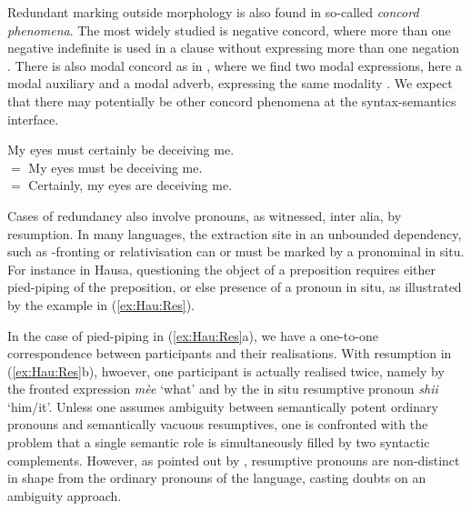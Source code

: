 \documentclass[output=paper]{langscibook}
\begin{document}
Redundant marking outside morphology is also found  in so-called
\emph{concord phenomena}.  The most widely studied is negative
concord, where more than one negative indefinite is used in a clause
without expressing more than one negation
\citep{Jespersen:17,denbesten:86,Zeijlstra:diss}. %
There is also modal concord as in , where we find two
modal expressions, here a modal auxiliary and a modal adverb,
expressing the same modality \citep{Zeijlstra:07,Huitink:12}.  We
expect that there may potentially be other concord phenomena at the
syntax-semantics interface.

\vbox{
\ea
My eyes must certainly be deceiving me.
\citep[404]{Huitink:12}\label{mod-conc}\\
$=$ My eyes must be deceiving me.\\
$=$ Certainly, my eyes are deceiving me.
\z 
}



\medskip%
Cases of redundancy also involve pronouns, as witnessed, inter alia,
by resumption.  In many languages, the extraction site in an unbounded
dependency, such as -fronting or relativisation can or must be
marked by a pronominal in situ. For instance in Hausa, questioning the
object of a preposition requires either pied-piping of the
preposition, or else presence of a pronoun in situ, as illustrated by
the example in (\ref{ex:Hau:Res}).

\begin{exe}
  \ex \label{ex:Hau:Res}
  \begin{xlist}
  \end{xlist}
\end{exe}  

In the case of pied-piping in (\ref{ex:Hau:Res}a), we have a
one-to-one correspondence between participants and their
realisations. 
With resumption in (\ref{ex:Hau:Res}b), hwoever, one participant is actually
realised twice, namely by the fronted  expression \textit{mèe}
`what' and
by the in situ resumptive pronoun \textit{shii} `him/it'. Unless one assumes
ambiguity between semantically potent ordinary pronouns and
semantically vacuous resumptives, one is confronted with the problem
that a single semantic role is simultaneously filled by two syntactic
complements. However, as pointed out by
\citet{mccloskey02:_resum_succes_cyclic_local_operat}, resumptive
pronouns are non-distinct in shape from the ordinary pronouns of the
language, casting doubts on an ambiguity approach. 
\end{document}
